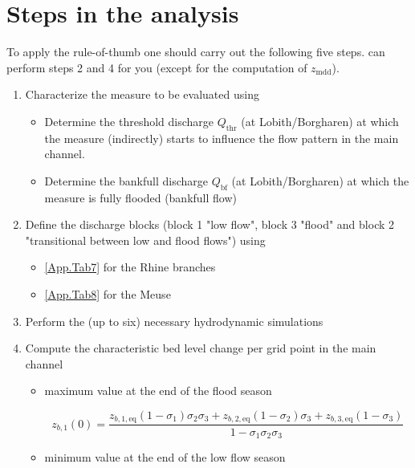 \section{Steps in the analysis}

To apply the rule-of-thumb one should carry out the following five steps.
\dfastmi can perform steps 2 and 4 for you (except for the computation of $z_\text{mdd}$).

\begin{enumerate}
\item Characterize the measure to be evaluated using \dfastmi

\begin{itemize}
\item Determine the threshold discharge $Q_\text{thr}$ (at Lobith/Borgharen) at which the measure (indirectly) starts to influence the flow pattern in the main channel.

\item Determine the bankfull discharge $Q_\text{bf}$ (at Lobith/Borgharen) at which the measure is fully flooded (bankfull flow)
\end{itemize}

\item Define the discharge blocks (block 1 "low flow", block 3 "flood" and block 2 "transitional between low and flood flows") using

\begin{itemize}
\item \autoref{App.Tab7} for the Rhine branches
\item \autoref{App.Tab8} for the Meuse
\end{itemize}

\item Perform the (up to six) necessary hydrodynamic simulations

\item Compute the characteristic bed level change per grid point in the main channel

\begin{itemize}
\item maximum value  at the end of the flood season

\begin{equation}
z_{b,1}(0) = \frac{z_{b,1,\text{eq}} (1-\sigma_1) \sigma_2 \sigma_3 + z_{b,2,\text{eq}} (1-\sigma_2) \sigma_3 + z_{b,3,\text{eq}} (1-\sigma_3)}{1 - \sigma_1 \sigma_2 \sigma_3}
\end{equation}

\item minimum value  at the end of the low flow season


\end{itemize}
\end{enumerate}
